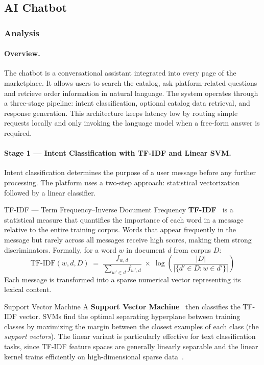 \subsection{AI Chatbot}

\subsubsection{Analysis}

\paragraph{Overview.}
The chatbot is a conversational assistant integrated into every page of the marketplace. It allows users to search the catalog, ask platform-related questions and retrieve order information in natural language. The system operates through a three-stage pipeline: intent classification, optional catalog data retrieval, and response generation. This architecture keeps latency low by routing simple requests locally and only invoking the language model when a free-form answer is required.

\paragraph{Stage 1 --- Intent Classification with TF-IDF and Linear SVM.}
Intent classification determines the purpose of a user message before any further processing. The platform uses a two-step approach: statistical vectorization followed by a linear classifier.

\vspace{4pt}
\begin{conceptbox}[aiBlue]{TF-IDF --- Term Frequency--Inverse Document Frequency}
\textbf{TF-IDF}~\cite{tfidf} is a statistical measure that quantifies the importance of each word in a message relative to the entire training corpus. Words that appear frequently in the message but rarely across all messages receive high scores, making them strong discriminators. Formally, for a word $w$ in document $d$ from corpus $D$:
\[
\text{TF-IDF}(w, d, D) \;=\; \frac{f_{w,d}}{\displaystyle\sum_{w' \in d} f_{w',d}} \;\times\; \log\!\left(\frac{|D|}{|\{d' \in D : w \in d'\}|}\right)
\]
Each message is transformed into a sparse numerical vector representing its lexical content.
\end{conceptbox}

\vspace{4pt}
\begin{conceptbox}[aiGreen]{Support Vector Machine}
A \textbf{Support Vector Machine}~\cite{svm} then classifies the TF-IDF vector. SVMs find the optimal separating hyperplane between training classes by maximizing the margin between the closest examples of each class (the \textit{support vectors}). The linear variant is particularly effective for text classification tasks, since TF-IDF feature spaces are generally linearly separable and the linear kernel trains efficiently on high-dimensional sparse data~\cite{sklearn}.
\end{conceptbox}

